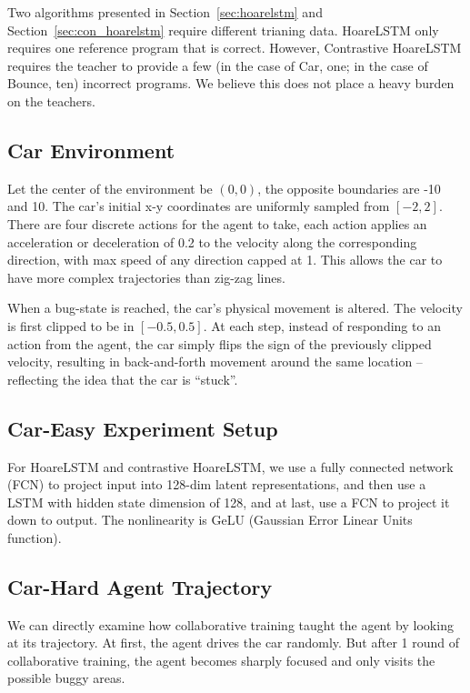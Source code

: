 \documentclass{article}
\begin{document}
Two algorithms presented in Section~\ref{sec:hoarelstm} and Section~\ref{sec:con_hoarelstm} require different trianing data. HoareLSTM only requires one reference program that is correct. However, Contrastive HoareLSTM requires the teacher to provide a few (in the case of Car, one; in the case of Bounce, ten) incorrect programs. We believe this does not place a heavy burden on the teachers.

\subsection{Car Environment}

Let the center of the environment be $(0, 0)$, the opposite boundaries are -10 and 10. The car's initial x-y coordinates are uniformly sampled from $[-2, 2]$. There are four discrete actions for the agent to take, each action applies an acceleration or deceleration of 0.2 to the velocity along the corresponding direction, with max speed of any direction capped at 1. This allows the car to have more complex trajectories than zig-zag lines. 

When a bug-state is reached, the car's physical movement is altered. The velocity is first clipped to be in $[-0.5, 0.5]$. At each step, instead of responding to an action from the agent, the car simply flips the sign of the previously clipped velocity, resulting in back-and-forth movement around the same location -- reflecting the idea that the car is ``stuck''.

\subsection{Car-Easy Experiment Setup}
\label{sec:app-car-easy-exp-setup}

For HoareLSTM and contrastive HoareLSTM, we use a fully connected network (FCN) to project input into 128-dim latent representations, and then use a LSTM with hidden state dimension of 128, and at last, use a FCN to project it down to output. The nonlinearity is GeLU (Gaussian Error Linear Units function). 

\subsection{Car-Hard Agent Trajectory}

We can directly examine how collaborative training taught the agent by looking at its trajectory. At first, the agent drives the car randomly. But after 1 round of collaborative training, the agent becomes sharply focused and only visits the possible buggy areas.
\end{document}
